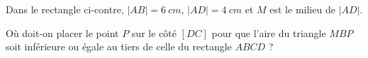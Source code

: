 %
%
    Dans le rectangle ci-contre, $|AB| = \SI{6}{cm}$, $|AD|=\SI{4}{cm}$ et $M$ est le milieu de $|AD|$.

    Où doit-on placer le point $P$ sur le côté $[DC]$ pour que l'aire du triangle $MBP$ soit inférieure ou égale au tiers de celle du rectangle $ABCD$ ?
    \begin{center}
    \end{center}
